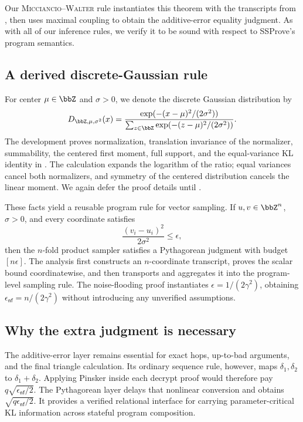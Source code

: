 Our \textsc{Micciancio--Walter} rule instantiates this theorem with the transcripts from , then uses maximal coupling to obtain the additive-error equality judgment.
As with all of our inference rules, we verify it to be sound with respect to SSProve's program semantics.

\subsection{A derived discrete-Gaussian rule}

For center \(\mu\in\bbZ\) and \(\sigma>0\), we denote the discrete Gaussian distribution by
\[
 D_{\bbZ,\mu,\sigma^2}(x)
 =\frac{\exp(-(x-\mu)^2/(2\sigma^2))}
        {\sum_{z\in\bbZ}\exp(-(z-\mu)^2/(2\sigma^2))}.
\]
The development proves normalization, translation invariance of the
normalizer, summability, the centered first moment, full support, and the
equal-variance KL identity in .
The calculation expands the
logarithm of the ratio; equal variances cancel both normalizers, and symmetry
of the centered distribution cancels the linear moment.
We again defer the proof details until .

These facts yield a reusable program rule for vector sampling.
If
\(u,v\in\bbZ^n\), \(\sigma>0\), and every coordinate satisfies
\[
 \frac{(v_i-u_i)^2}{2\sigma^2}\leq\epsilon,
\]
then the $n$-fold product sampler satisfies a Pythagorean
judgment with budget \([n\epsilon]\).
The analysis first constructs
an \(n\)-coordinate transcript, proves the scalar bound coordinatewise, and
then transports and aggregates it into the program-level sampling rule.
The
noise-flooding proof instantiates \(\epsilon=1/(2\gamma^2)\), obtaining
\(\epsilon_{\mathsf{nf}}=n/(2\gamma^2)\) without introducing any unverified assumptions.

\subsection{Why the extra judgment is necessary}

The additive-error layer remains essential for exact hops, up-to-bad arguments, and the final triangle calculation.
Its ordinary sequence rule, however, maps \(\delta_1,\delta_2\) to \(\delta_1+\delta_2\).
Applying Pinsker inside each decrypt proof would therefore pay \(q\sqrt{\epsilon_{\mathsf{nf}}/2}\).
The Pythagorean layer delays that nonlinear conversion and obtains \(\sqrt{q\epsilon_{\mathsf{nf}}/2}\).
It provides a verified relational interface for carrying parameter-critical KL
information across stateful program composition.

